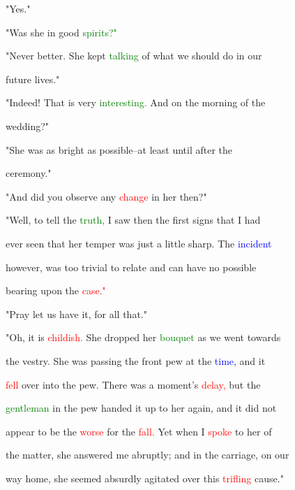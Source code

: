  "Yes."



 "Was she in \textcolor{BurntOrange}{good} \textcolor{green}{spirits?"}



 "Never better. She kept \textcolor{green}{talking} of what we should do in our

 future lives."



 "Indeed! That is very \textcolor{green}{interesting.} And on the morning of the

 wedding?"



 "She was as bright as possible--at least until after the

 \textcolor{BurntOrange}{ceremony."}



 "And did you observe any \textcolor{red}{change} in her then?"



 "Well, to tell the \textcolor{green}{truth,} I saw then the first signs that I had

 ever seen that her temper was just a little sharp. The \textcolor{blue}{incident}

 however, was too trivial to relate and can have no possible

 bearing upon the \textcolor{red}{case."}



 \textcolor{BurntOrange}{"Pray} let us have it, for all that."



 "Oh, it is \textcolor{red}{childish.} She dropped her \textcolor{green}{bouquet} as we went towards

 the vestry. She was passing the front pew at the \textcolor{blue}{time,} and it

 \textcolor{red}{fell} over into the pew. There was a moment's \textcolor{red}{delay,} but the

 \textcolor{green}{gentleman} in the pew handed it up to her again, and it did not

 appear to be the \textcolor{red}{worse} for the \textcolor{red}{fall.} Yet when I \textcolor{red}{spoke} to her of

 the matter, she answered me abruptly; and in the carriage, on our

 way home, she seemed absurdly agitated over this \textcolor{red}{trifling} cause."




